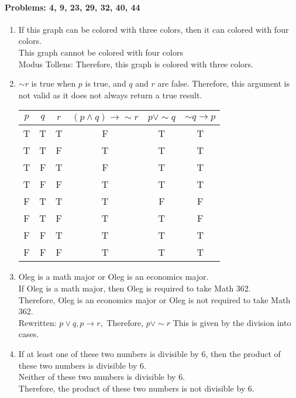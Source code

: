 \documentclass{article}
\makeatletter
\newcommand\setItemnumber[1]{\setcounter{enum\romannumeral\@enumdepth}{\numexpr#1-1\relax}}
\makeatother
\begin{document}
\paragraph{Problems: 4, 9, 23, 29, 32, 40, 44}
\begin{enumerate}
    \setItemnumber{4}
    \item If this graph can be colored with three colors, then it can colored with four colors. \\
    This graph cannot be colored with four colors\\
    Modus Tollens: Therefore, this graph is colored with three colors.
    \setItemnumber{9}
    \item $\sim r$ is true when $p$ is true, and $q$ and $r$ are false. Therefore, this argument is not valid as it does not always return a true result.
    \\
\begin{tabular}{|c|c|c|c|c|c|}
  $p$ & $q$ & $r$ & $(p \land q) \rightarrow \sim r$ & $p \lor \sim q$ & $\sim q \rightarrow p$ \\
  \hline
  T & T & T & F & T & T \\
  T & T & F & T & T & T \\
  T & F & T & F & T & T \\
  T & F & F & T & T & T \\
  F & T & T & T & F & F \\
  F & T & F & T & T & F \\
  F & F & T & T & T & T \\
  F & F & F & T & T & T \\
\end{tabular}
    \setItemnumber{23}
    \item Oleg is a math major or Oleg is an economics major. 
    \\If Oleg is a math major, then Oleg is required to take Math 362. 
    \\ Therefore, Oleg is an economics major or Oleg is not required to take Math 362.
    \\ Rewritten: $p \lor q, p \rightarrow r,$ Therefore, $p\lor \sim r$ This is given by the division into cases.
    \setItemnumber{29}
    \item If at least one of these two numbers is divisible by 6, then the product of these two numbers is divisible by 6.\\
    Neither of these two numbers is divisible by 6. \\
    Therefore, the product of these two numbers is not divisible by 6.

\end{enumerate}
\end{document}
